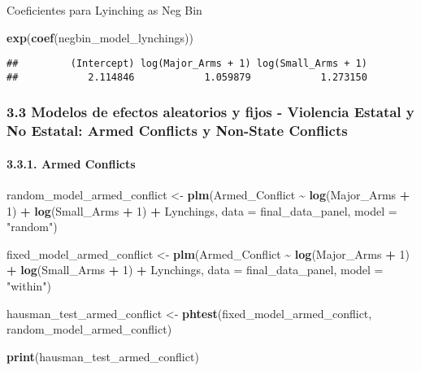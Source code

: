 \documentclass[
  11pt,
]{article}
\newenvironment{Shaded}{\begin{snugshade}}{\end{snugshade}}
\newcommand{\AttributeTok}[1]{\textcolor[rgb]{0.13,0.29,0.53}{#1}}
\newcommand{\DecValTok}[1]{\textcolor[rgb]{0.00,0.00,0.81}{#1}}
\newcommand{\FunctionTok}[1]{\textcolor[rgb]{0.13,0.29,0.53}{\textbf{#1}}}
\newcommand{\NormalTok}[1]{#1}
\newcommand{\OtherTok}[1]{\textcolor[rgb]{0.56,0.35,0.01}{#1}}
\newcommand{\SpecialCharTok}[1]{\textcolor[rgb]{0.81,0.36,0.00}{\textbf{#1}}}
\newcommand{\StringTok}[1]{\textcolor[rgb]{0.31,0.60,0.02}{#1}}
\begin{document}
Coeficientes para Lyinching as Neg Bin

\begin{Shaded}
\begin{Highlighting}[]
\FunctionTok{exp}\NormalTok{(}\FunctionTok{coef}\NormalTok{(negbin\_model\_lynchings))}
\end{Highlighting}
\end{Shaded}

\begin{verbatim}
##         (Intercept) log(Major_Arms + 1) log(Small_Arms + 1) 
##            2.114846            1.059879            1.273150
\end{verbatim}

\subsubsection{3.3 Modelos de efectos aleatorios y fijos - Violencia
Estatal y No Estatal: Armed Conflicts y Non-State
Conflicts}\label{modelos-de-efectos-aleatorios-y-fijos---violencia-estatal-y-no-estatal-armed-conflicts-y-non-state-conflicts}

\paragraph{3.3.1. Armed Conflicts}\label{armed-conflicts}

\begin{Shaded}
\begin{Highlighting}[]
\NormalTok{random\_model\_armed\_conflict }\OtherTok{\textless{}{-}} \FunctionTok{plm}\NormalTok{(Armed\_Conflict }\SpecialCharTok{\textasciitilde{}} \FunctionTok{log}\NormalTok{(Major\_Arms }\SpecialCharTok{+} \DecValTok{1}\NormalTok{) }\SpecialCharTok{+} \FunctionTok{log}\NormalTok{(Small\_Arms }\SpecialCharTok{+} \DecValTok{1}\NormalTok{) }\SpecialCharTok{+}\NormalTok{ Lynchings,                                     }\AttributeTok{data =}\NormalTok{ final\_data\_panel, }\AttributeTok{model =} \StringTok{"random"}\NormalTok{)}

\NormalTok{fixed\_model\_armed\_conflict }\OtherTok{\textless{}{-}} \FunctionTok{plm}\NormalTok{(Armed\_Conflict }\SpecialCharTok{\textasciitilde{}} \FunctionTok{log}\NormalTok{(Major\_Arms }\SpecialCharTok{+} \DecValTok{1}\NormalTok{) }\SpecialCharTok{+} \FunctionTok{log}\NormalTok{(Small\_Arms }\SpecialCharTok{+} \DecValTok{1}\NormalTok{) }\SpecialCharTok{+}\NormalTok{ Lynchings,                                    }\AttributeTok{data =}\NormalTok{ final\_data\_panel, }\AttributeTok{model =} \StringTok{"within"}\NormalTok{)}

\NormalTok{hausman\_test\_armed\_conflict }\OtherTok{\textless{}{-}} \FunctionTok{phtest}\NormalTok{(fixed\_model\_armed\_conflict, random\_model\_armed\_conflict)}

\FunctionTok{print}\NormalTok{(hausman\_test\_armed\_conflict)  }
\end{Highlighting}
\end{Shaded}
\end{document}
